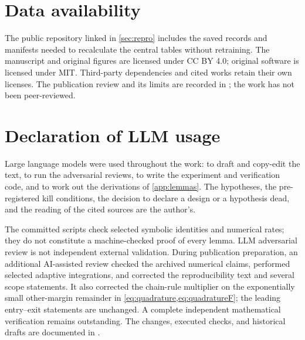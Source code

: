 \documentclass[11pt]{article}
\theoremstyle{definition}
\theoremstyle{remark}
\begin{document}
\section*{Data availability}
The public repository linked in \cref{sec:repro} includes the saved records
and manifests needed to recalculate the central tables without retraining.
The manuscript and original figures are licensed under CC BY 4.0; original
software is licensed under MIT. Third-party dependencies and cited works
retain their own licenses. The publication review and its limits are recorded
in ; the work has not been peer-reviewed.

\section*{Declaration of LLM usage} Large language models were used throughout
the work: to draft and copy-edit the text, to run the adversarial reviews, to
write the experiment and verification code, and to work out the derivations of
\cref{app:lemmas}. The hypotheses, the pre-registered kill conditions, the
decision to declare a design or a hypothesis dead, and the reading of the
cited sources are the author's.

The committed scripts check selected symbolic identities and numerical
rates; they do not constitute a machine-checked proof of every lemma. LLM
adversarial review is not independent external validation. During publication
preparation, an additional AI-assisted review checked the archived numerical
claims, performed selected adaptive integrations, and corrected the
reproducibility text and several scope statements. It also corrected the
chain-rule multiplier on the exponentially small other-margin remainder in
\cref{eq:quadrature,eq:quadratureF}; the leading entry--exit statements are
unchanged. A complete independent mathematical verification remains outstanding.
The changes, executed checks, and historical drafts are documented in
.
\end{document}
